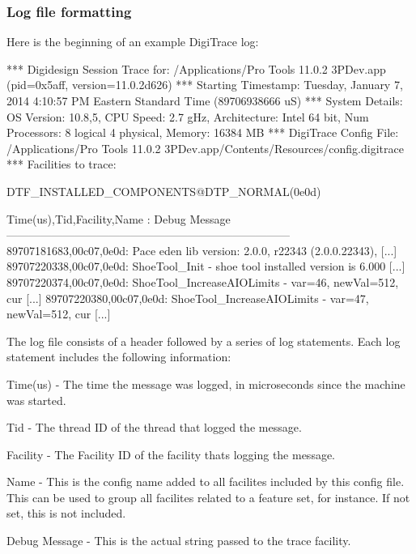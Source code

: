 \hypertarget{a00364_digitrace__logfiles__format}{}\subsubsection{Log file formatting}\label{a00364_digitrace__logfiles__format}
 Here is the beginning of an example Digi\+Trace log\+: \begin{DoxyVerb}*** Digidesign Session Trace for:	/Applications/Pro Tools 11.0.2 3PDev.app (pid=0x5aff, version=11.0.2d626)
*** Starting Timestamp:			Tuesday, January 7, 2014 4:10:57 PM Eastern Standard Time (89706938666 uS)
*** System Details:			OS Version: 10.8,5, CPU Speed:  2.7 gHz, Architecture: Intel 64 bit, Num Processors: 8 logical 4 physical, Memory: 16384 MB
*** DigiTrace Config File:		/Applications/Pro Tools 11.0.2 3PDev.app/Contents/Resources/config.digitrace
*** Facilities to trace:

DTF_INSTALLED_COMPONENTS@DTP_NORMAL(0e0d)

Time(us),Tid,Facility,Name : Debug Message
---------------------------------------------------------------------------
89707181683,00c07,0e0d: Pace eden lib version: 2.0.0, r22343 (2.0.0.22343),  [...]
89707220338,00c07,0e0d: ShoeTool_Init - shoe tool installed version is 6.000 [...]
89707220374,00c07,0e0d: ShoeTool_IncreaseAIOLimits - var=46, newVal=512, cur [...]
89707220380,00c07,0e0d: ShoeTool_IncreaseAIOLimits - var=47, newVal=512, cur [...]	 \end{DoxyVerb}


 The log file consists of a header followed by a series of log statements. Each log statement includes the following information\+:

 
\begin{DoxyItemize}
\item Time(us) -\/ The time the message was logged, in microseconds since the machine was started.  
\item Tid -\/ The thread I\+D of the thread that logged the message.  
\item Facility -\/ The Facility I\+D of the facility that\textquotesingle{}s logging the message.  
\item Name -\/ This is the config name added to all facilites included by this config file. This can be used to group all facilites related to a feature set, for instance. If not set, this is not included.  
\item Debug Message -\/ This is the actual string passed to the trace facility.  
\end{DoxyItemize}



